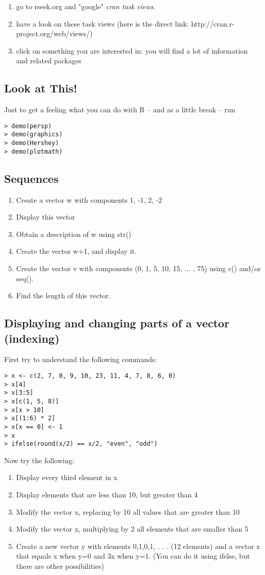 \documentclass[12pt]{article}
\begin{document}
\begin{enumerate}
\item go to rseek.org and "google" \emph{cran task views}.
\item have a look on these task views (here is the direct link: http://cran.r-project.org/web/views/)
\item click on something you are interested in: you will find a lot of information and related packages
\end{enumerate}

\subsection{Look at This!}
Just to get a feeling what you can do with R -- and as a little break  -- run
\begin{verbatim}
> demo(persp)
> demo(graphics)
> demo(Hershey)
> demo(plotmath)
\end{verbatim}

\subsection{Sequences}
\begin{enumerate}
\item Create a vector w with components 1, -1, 2, -2
\item Display this vector
\item Obtain a description of w using str()
\item Create the vector w+1, and display it.
\item Create the vector v with components (0, 1, 5, 10, 15, ... , 75) using c() and/or seq().
\item Find the length of this vector.
\end{enumerate}


\subsection{Displaying and changing parts of a vector (indexing)}
First try to understand the following commands:
\begin{verbatim}
> x <- c(2, 7, 0, 9, 10, 23, 11, 4, 7, 8, 6, 0)
> x[4]
> x[3:5]
> x[c(1, 5, 8)]
> x[x > 10]
> x[(1:6) * 2]
> x[x == 0] <- 1
> x
> ifelse(round(x/2) == x/2, "even", "odd")       
\end{verbatim}

Now try the following:
\begin{enumerate}
\item Display every third element in x
\item Display elements that are less than 10, but greater than 4
\item Modify the vector x, replacing by 10 all values that are greater than 10
\item Modify the vector x, multiplying by 2 all elements that are smaller than 5
\item Create a new vector y with elements 0,1,0,1, . . . (12 elements) and a vector z that equals x when y=0 and 3x when y=1. (You can do it using ifelse, but there are other possibilities)
\end{enumerate}
\end{document}
